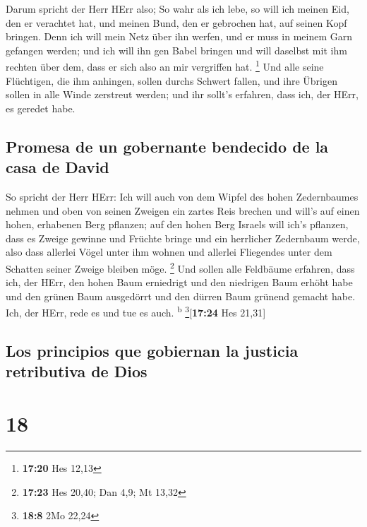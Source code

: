  Darum spricht der Herr HErr also; So wahr als ich lebe,
so will ich meinen Eid, den er verachtet hat, und meinen Bund, den er
gebrochen hat, auf seinen Kopf bringen.  Denn ich will
mein Netz über ihn werfen, und er muss in meinem Garn gefangen werden;
und ich will ihn gen Babel bringen und will daselbst mit ihm rechten
über dem, dass er sich also an mir vergriffen hat. \footnote{\textbf{17:20}
  Hes 12,13}  Und alle seine Flüchtigen, die ihm
anhingen, sollen durchs Schwert fallen, und ihre Übrigen sollen in alle
Winde zerstreut werden; und ihr sollt's erfahren, dass ich, der HErr, es
geredet habe.

\hypertarget{promesa-de-un-gobernante-bendecido-de-la-casa-de-david}{%
\subsection{Promesa de un gobernante bendecido de la casa de
David}\label{promesa-de-un-gobernante-bendecido-de-la-casa-de-david}}

 So spricht der Herr HErr: Ich will auch von dem Wipfel
des hohen Zedernbaumes nehmen und oben von seinen Zweigen ein zartes
Reis brechen und will's auf einen hohen, erhabenen Berg pflanzen;
 auf den hohen Berg Israels will ich's pflanzen, dass es
Zweige gewinne und Früchte bringe und ein herrlicher Zedernbaum werde,
also dass allerlei Vögel unter ihm wohnen und allerlei Fliegendes unter
dem Schatten seiner Zweige bleiben möge. \footnote{\textbf{17:23} Hes
  20,40; Dan 4,9; Mt 13,32}  Und sollen alle Feldbäume
erfahren, dass ich, der HErr, den hohen Baum erniedrigt und den
niedrigen Baum erhöht habe und den grünen Baum ausgedörrt und den dürren
Baum grünend gemacht habe. Ich, der HErr, rede es und tue es auch.
\textsuperscript{b} \footnote{\textbf{18:8} 2Mo 22,24}{[}\textbf{17:24}
Hes 21,31{]}

\hypertarget{los-principios-que-gobiernan-la-justicia-retributiva-de-dios}{%
\subsection{Los principios que gobiernan la justicia retributiva de
Dios}\label{los-principios-que-gobiernan-la-justicia-retributiva-de-dios}}

\hypertarget{section-17}{%
\section{18}\label{section-17}}

